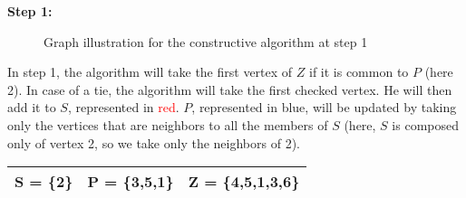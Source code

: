     \begin{minipage}{\linewidth}
        \textbf{Step 1:} \newline
        \begin{minipage}{0.4\textwidth}
            \begin{figure}[H]
                \centering
                \caption{Graph illustration for the constructive algorithm at step 1}
                \label{fig:constructive-mewc-maxedge-step1}
            \end{figure}
        \end{minipage}
        \begin{minipage}{0.6\textwidth}
            In step 1, the algorithm will take the first vertex of $Z$ if it is common to $P$ (here 2). In case of a tie, the algorithm will take the first checked vertex. He will then add it to $S$, represented in \textcolor{red}{red}. $P$, represented in \textcolor{Cerulean}{blue}, will be updated by taking only the vertices that are neighbors to all the members of $S$ (here, $S$ is composed only of vertex 2, so we take only the neighbors of 2).
    
            \begin{center}
                \begin{tabular}{|lll|}
                    \hline
                    S = \{2\} & P = \{3,5,1\} & Z = \{4,5,1,3,6\} \\
                    \hline
                \end{tabular}
            \end{center}
        \end{minipage}
    \end{minipage} 

